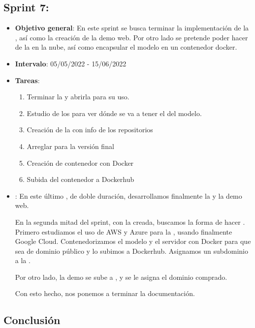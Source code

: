 \subsection{Sprint 7: }

\begin{itemize}
  \item  \textbf{Objetivo general}: En este sprint se busca terminar la implementación de la , así como la creación de la demo web. Por otro lado se pretende poder hacer  de la  en la nube, así como encapsular el modelo en un contenedor docker.

  \item \textbf{Intervalo}: 05/05/2022 - 15/06/2022

  \item \textbf{Tareas}:
        \begin{enumerate}
          \item Terminar la   y abrirla para su uso.
          \item Estudio de los  para ver dónde se va a tener el  del modelo.
          \item Creación de la  con info de los repositorios
          \item Arreglar  para la versión final
          \item Creación de contenedor con Docker
          \item Subida del contenedor a Dockerhub
        \end{enumerate}

  \item \textbf{}: En este último , de doble duración, desarrollamos finalmente la   y la demo web.

        En la segunda mitad del sprint, con la  creada, buscamos la forma de hacer . Primero estudiamos el uso de AWS y Azure para la , usando finalmente Google Cloud. Contenedorizamos el modelo y el servidor con Docker para que sea de dominio público y lo subimos a Dockerhub. Asignamos un subdominio a la .

        Por otro lado, la demo se sube a , y se le asigna el dominio comprado.

        Con esto hecho, nos ponemos a terminar la documentación.
\end{itemize}

\subsection{Conclusión}

